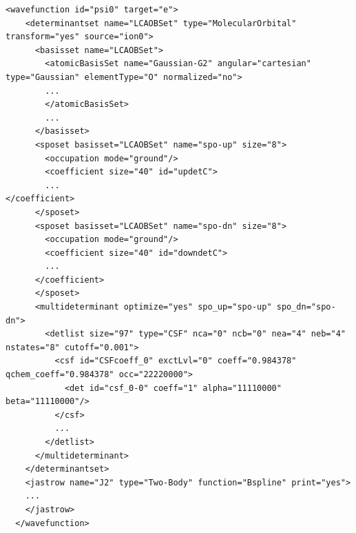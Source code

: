 \begin{lstlisting}[style=QMCPXML,caption=``Basic framework for a multideterminant determinantset XML block.",label=lam_xml_multideterminant]
  <wavefunction id="psi0" target="e">
    <determinantset name="LCAOBSet" type="MolecularOrbital" transform="yes" source="ion0">
      <basisset name="LCAOBSet">
        <atomicBasisSet name="Gaussian-G2" angular="cartesian" type="Gaussian" elementType="O" normalized="no">
        ...
        </atomicBasisSet>
        ...
      </basisset>
      <sposet basisset="LCAOBSet" name="spo-up" size="8">
        <occupation mode="ground"/>
        <coefficient size="40" id="updetC">
        ...
</coefficient>
      </sposet>
      <sposet basisset="LCAOBSet" name="spo-dn" size="8">
        <occupation mode="ground"/>
        <coefficient size="40" id="downdetC">
        ...
      </coefficient>
      </sposet>
      <multideterminant optimize="yes" spo_up="spo-up" spo_dn="spo-dn">
        <detlist size="97" type="CSF" nca="0" ncb="0" nea="4" neb="4" nstates="8" cutoff="0.001">
          <csf id="CSFcoeff_0" exctLvl="0" coeff="0.984378" qchem_coeff="0.984378" occ="22220000">
            <det id="csf_0-0" coeff="1" alpha="11110000" beta="11110000"/>
          </csf>
          ...
        </detlist>
      </multideterminant>
    </determinantset>
    <jastrow name="J2" type="Two-Body" function="Bspline" print="yes">
    ...
    </jastrow>
  </wavefunction>
\end{lstlisting}

